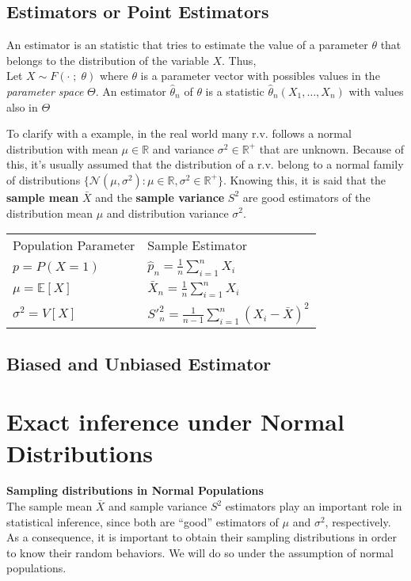 \subsection{Estimators or Point Estimators}
An estimator is an statistic that tries to estimate the value of a parameter $\theta$ that belongs to the distribution of the variable
$X$. Thus,\\

Let $X \sim F(\cdot\;;\;\theta)$ where $\theta$ is a parameter vector with possibles values in the \textit{parameter space} $\Theta$.
An estimator $\hat{\theta}_n$ of $\theta$ is a statistic $\hat{\theta}_n(X_1,\dots,X_n)$ with values also in $\Theta$ 

To clarify with a example, in the real world many r.v. follows a normal distribution with mean $\mu \in \mathbb{R}$ and variance 
$\sigma^2 \in \mathbb{R}^+$ that are unknown. Because of this, it's usually assumed that the distribution of a r.v. belong to a 
normal family of distributions $\{\mathcal{N}(\mu,\sigma^2):\mu\in\mathbb{R},\sigma^2\in \mathbb{R^+} \}$. Knowing this, it is said 
that the \textbf{sample mean} $\bar{X}$ and the \textbf{sample variance} $S^2$ are good estimators of the distribution mean $\mu$ 
and distribution variance $\sigma^2$.

\begin{table}[H]
    \centering
    \begin{tabular}{ll}
    Population Parameter    & Sample Estimator                          \\
    $p = P(X=1)$            & $\hat{p}_n = \frac{1}{n}\sum_{i=1}^n X_i$ \\
    $\mu = \mathbb{E}[X]$   & $\bar{X}_n = \frac{1}{n}\sum_{i=1}^n X_i$ \\
    $\sigma^2 = V[X]$       & $S'^2_n = \frac{1}{n-1}\sum_{i=1}^{n} (X_i-\bar{X})^2 $
    \end{tabular}
\end{table}

\subsection{Biased and Unbiased Estimator}

\section{Exact inference under Normal Distributions}
\textbf{Sampling distributions in Normal Populations}\\
The sample mean $\bar{X}$ and sample variance $S^2$ estimators play an important role in statistical inference, since both are “good” estimators
of $\mu$ and $\sigma^2$, respectively. As a consequence, it is important to obtain their sampling distributions in order to know their random behaviors. 
We will do so under the assumption of normal populations.

